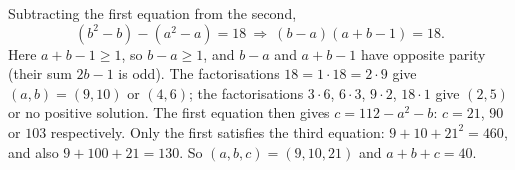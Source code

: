 Subtracting the first equation from the second,
\[
(b^2-b)-(a^2-a)=18\ \Longrightarrow\ (b-a)(a+b-1)=18 .
\]
Here $a+b-1\ge1$, so $b-a\ge1$, and $b-a$ and $a+b-1$ have opposite parity (their sum $2b-1$ is odd). The factorisations $18=1\cdot18=2\cdot9$ give $(a,b)=(9,10)$ or $(4,6)$; the factorisations $3\cdot6$, $6\cdot3$, $9\cdot2$, $18\cdot1$ give $(2,5)$ or no positive solution. The first equation then gives $c=112-a^2-b$: $c=21$, $90$ or $103$ respectively. Only the first satisfies the third equation: $9+10+21^2=460$, and also $9+100+21=130$. So $(a,b,c)=(9,10,21)$ and $a+b+c=\boxed{40}$.
